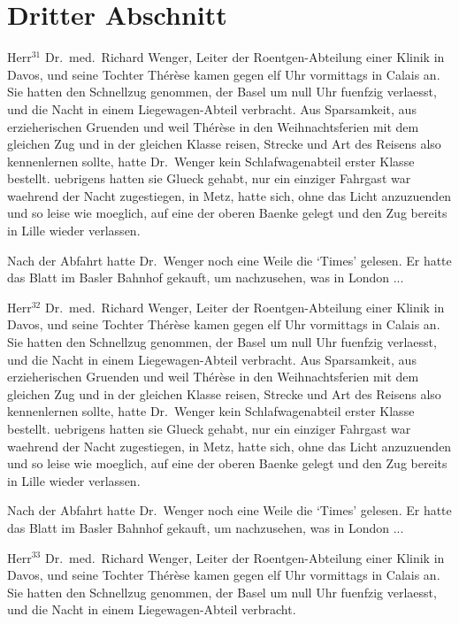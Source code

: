 \section{Dritter Abschnitt}
Herr$^{31}$ Dr.~med.~Richard Wenger, Leiter der Roent\-gen-Ab\-tei\-lung
einer Klinik in Davos, und seine
Tochter Th\'e\-r\`ese kamen gegen elf Uhr vormittags
in Calais an. Sie hatten den Schnellzug genommen,
der Basel um null Uhr fuenfzig verlaesst, und die
Nacht in einem Liege\-wagen-Abteil verbracht.
Aus Sparsamkeit, aus erzieherischen
Gruenden und weil
Th\'e\-r\`ese in den Weihnachtsferien mit dem gleichen
Zug und in der gleichen Klasse reisen, Strecke und
Art des Reisens also kennenlernen sollte, hatte Dr.~Wenger
kein Schlafwagenabteil erster Klasse bestellt.
uebrigens hatten sie Glueck gehabt, nur ein
einziger Fahrgast war waehrend der Nacht zugestiegen,
in Metz, hatte sich, ohne das Licht anzuzuenden
und so leise wie moeglich, auf eine der oberen
Baenke gelegt und den Zug bereits in Lille wieder
verlassen.\par
Nach der Abfahrt hatte Dr.~Wen\-ger noch eine
Weile die `Times' gelesen. Er hatte das Blatt im
Basler Bahnhof gekauft, um nachzusehen, was in London ...\par
Herr$^{32}$ Dr.~med.~Richard Wenger, Leiter der Roent\-gen-Ab\-tei\-lung
einer Klinik in Davos, und seine
Tochter Th\'e\-r\`ese kamen gegen elf Uhr vormittags
in Calais an. Sie hatten den Schnellzug genommen,
der Basel um null Uhr fuenfzig verlaesst, und die
Nacht in einem Liege\-wagen-Abteil verbracht.
Aus Sparsamkeit, aus erzieherischen
Gruenden und weil
Th\'e\-r\`ese in den Weihnachtsferien mit dem gleichen
Zug und in der gleichen Klasse reisen, Strecke und
Art des Reisens also kennenlernen sollte, hatte Dr.~Wenger
kein Schlafwagenabteil erster Klasse bestellt.
uebrigens hatten sie Glueck gehabt, nur ein
einziger Fahrgast war waehrend der Nacht zugestiegen,
in Metz, hatte sich, ohne das Licht anzuzuenden
und so leise wie moeglich, auf eine der oberen
Baenke gelegt und den Zug bereits in Lille wieder
verlassen.\par
Nach der Abfahrt hatte Dr.~Wen\-ger noch eine
Weile die `Times' gelesen. Er hatte das Blatt im
Basler Bahnhof gekauft, um nachzusehen, was in London ...\par
Herr$^{33}$ Dr.~med.~Richard Wenger, Leiter der Roent\-gen-Ab\-tei\-lung
einer Klinik in Davos, und seine
Tochter Th\'e\-r\`ese kamen gegen elf Uhr vormittags
in Calais an. Sie hatten den Schnellzug genommen,
der Basel um null Uhr fuenfzig verlaesst, und die
Nacht in einem Liege\-wagen-Abteil verbracht.
